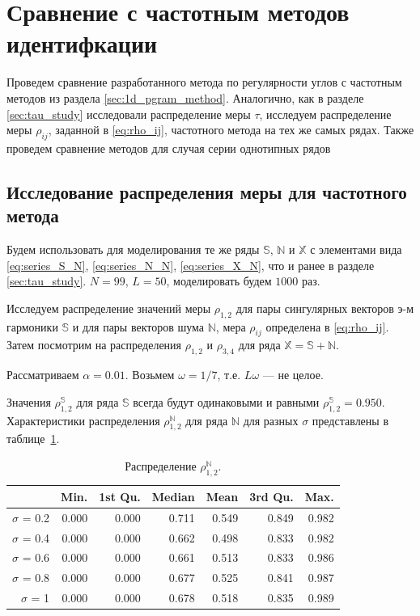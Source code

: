 \documentclass[specialist,
               substylefile = spbu.rtx,
               subf,href,colorlinks=true, 12pt]{disser}
\begin{document}
\section{Сравнение с частотным методов идентифкации}
\label{sec:compare}
Проведем сравнение разработанного метода по регулярности углов с частотным методов из раздела \ref{sec:1d_pgram_method}.
Аналогично, как в разделе \ref{sec:tau_study} исследовали распределение меры $\tau$, исследуем распределение меры $\rho_{ij}$, заданной в \eqref{eq:rho_ij}, частотного метода на тех же самых рядах. 
Также проведем сравнение методов для случая серии однотипных рядов

\subsection{Исследование распределения меры для частотного метода}
\label{sec:per_study}

Будем использовать для моделирования те же ряды $\mathbb{S}$, $\mathbb{N}$ и $\mathbb{X}$ с элементами вида
\eqref{eq:series_S_N}, \eqref{eq:series_N_N}, \eqref{eq:series_X_N}, что и ранее в разделе \ref{sec:tau_study}.
$N = 99$, $L = 50$, моделировать будем $1000$ раз.

Исследуем распределение значений  меры $\rho_{1,2}$ для пары сингулярных векторов э-м гармоники $\mathbb{S}$ и для пары векторов шума $\mathbb{N}$, мера $\rho_{ij}$ определена в \eqref{eq:rho_ij}. Затем посмотрим на распределения  $\rho_{1,2}$ и  $\rho_{3,4}$ для ряда $\mathbb{X} = \mathbb{S} + \mathbb{N}$.

Рассматриваем $\alpha = 0.01$. Возьмем $\omega = 1/7$, т.е. $L\omega$ --- не целое.

Значения $\rho^{\mathbb{S}}_{1,2}$  для ряда $\mathbb{S}$ всегда будут одинаковыми и равными  $\rho^{\mathbb{S}}_{1,2} = 0.950$. Характеристики распределения $\rho^{\mathbb{N}}_{1,2}$ для ряда $\mathbb{N}$ для разных $\sigma$ представлены в таблице~\ref{tab:model_dist_pgram_sig2}.

\begin{table}[hhh!]
\caption{Распределение $\rho^{\mathbb{N}}_{1,2}$.}
\centering
\begin{tabular}{rrrrrrr}
  \hline
 & Min. & 1st Qu. & Median & Mean & 3rd Qu. & Max. \\
  \hline
$\sigma$ = 0.2 & 0.000 & 0.000 & 0.711 & 0.549 & 0.849 & 0.982 \\ 
  $\sigma$ = 0.4 & 0.000 & 0.000 & 0.662 & 0.498 & 0.833 & 0.982 \\ 
  $\sigma$ = 0.6 & 0.000 & 0.000 & 0.661 & 0.513 & 0.833 & 0.986 \\ 
  $\sigma$ = 0.8 & 0.000 & 0.000 & 0.677 & 0.525 & 0.841 & 0.987 \\ 
  $\sigma$ = 1 & 0.000 & 0.000 & 0.678 & 0.518 & 0.835 & 0.989 \\ 
   \hline
\end{tabular}
\label{tab:model_dist_pgram_sig2}
\end{table}
\end{document}
